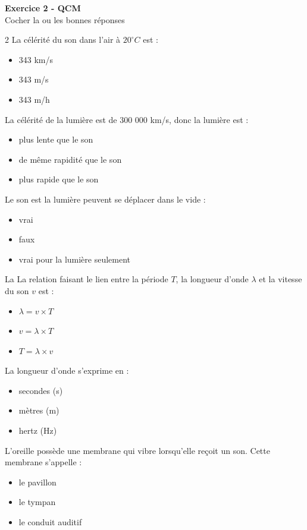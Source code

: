 \documentclass[11pt,a4paper]{article}
\begin{document}
\textbf{Exercice 2 - QCM}\\
Cocher la ou les bonnes réponses\\
\begin{multicols}{2}
 La célérité du son dans l'air à $20^{\circ} C$ est : 
\begin{itemize}[label=$\square$]
	\item 343 km/s
	\item 343 m/s
	\item 343 m/h
\end{itemize}


 La célérité de la lumière est de 300 000 km/s, donc la lumière est : 
\begin{itemize}[label=$\square$]
	\item plus lente que le son
	\item de même rapidité que le son
	\item plus rapide que le son
\end{itemize}


 Le son est la lumière peuvent se déplacer dans le vide : 
\begin{itemize}[label=$\square$]
	\item vrai
	\item faux
	\item vrai pour la lumière seulement
\end{itemize}


 La La relation faisant le lien entre la période $T$, la longueur d'onde $\lambda$ et la vitesse du son $v$ est : 
\begin{itemize}[label=$\square$]
	\item $\lambda = v \times T$
	\item $v = \lambda \times T$
	\item $T = \lambda \times v$
\end{itemize}

\columnbreak

 La longueur d'onde s'exprime en  : 
\begin{itemize}[label=$\square$]
	\item secondes (s)
	\item mètres (m)
	\item hertz (Hz)
\end{itemize}

 L'oreille possède une membrane qui vibre lorsqu'elle reçoit un son. Cette membrane s'appelle : 
\begin{itemize}[label=$\square$]
	\item le pavillon
	\item le tympan
	\item le conduit auditif
\end{itemize}


\end{multicols}
\end{document}
